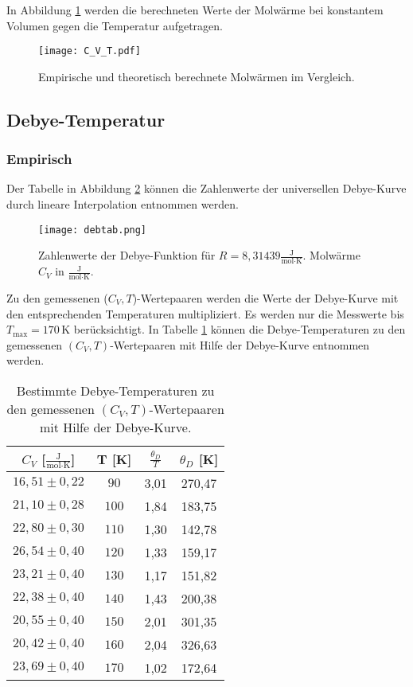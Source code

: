 In Abbildung \ref{C_V} werden die berechneten Werte der Molwärme bei konstantem Volumen gegen die Temperatur aufgetragen.

\begin{figure}[H]
  \centering
  \texttt{[image: C\_V\_T.pdf]}
  \caption{Empirische und theoretisch berechnete Molwärmen im Vergleich.}
  \label{C_V}
\end{figure}

\subsection{Debye-Temperatur}
\subsubsection{Empirisch}

Der Tabelle in Abbildung \ref{debfkt} können die Zahlenwerte der universellen Debye-Kurve durch lineare Interpolation entnommen werden.

\begin{figure}[H]
  \centering
  \texttt{[image: debtab.png]}
  \caption{Zahlenwerte der Debye-Funktion für $R = 8,31439\frac{\text{J}}{\text{mol}\cdot\text{K}}$. Molwärme $C_V$ in $\frac{\text{J}}{\text{mol}\cdot\text{K}}$. \cite{skript}}
  \label{debfkt}
\end{figure}

Zu den gemessenen ($C_V,T$)-Wertepaaren werden die Werte der Debye-Kurve mit den entsprechenden Temperaturen multipliziert.
Es werden nur die Messwerte bis $T_{\text{max}} = 170$\,K berücksichtigt.
In Tabelle \ref{tab:3} können die Debye-Temperaturen zu den gemessenen $(C_V,T)$-Wertepaaren mit Hilfe der Debye-Kurve entnommen werden.

\begin{table}[H]
  \centering
  \begin{tabular}{cccc}
    \toprule
    $C_V$ [$\frac{\text{J}}{\text{mol}\cdot\text{K}}$] & T [K] & $\frac{\theta_D}{T}$ & $\theta_D$ [K] \\
    \midrule
    $16,51 \pm 0,22$ & $ 90$ & 3,01 & 270,47 \\
    $21,10 \pm 0,28$ & $100$ & 1,84 & 183,75 \\
    $22,80 \pm 0,30$ & $110$ & 1,30 & 142,78 \\
    $26,54 \pm 0,40$ & $120$ & 1,33 & 159,17 \\
    $23,21 \pm 0,40$ & $130$ & 1,17 & 151,82 \\
    $22,38 \pm 0,40$ & $140$ & 1,43 & 200,38 \\
    $20,55 \pm 0,40$ & $150$ & 2,01 & 301,35 \\
    $20,42 \pm 0,40$ & $160$ & 2,04 & 326,63 \\
    $23,69 \pm 0,40$ & $170$ & 1,02 & 172,64 \\
    \bottomrule
  \end{tabular}
  \caption{Bestimmte Debye-Temperaturen zu den gemessenen $(C_V,T)$-Wertepaaren mit Hilfe der Debye-Kurve.}
  \label{tab:3}
\end{table}

